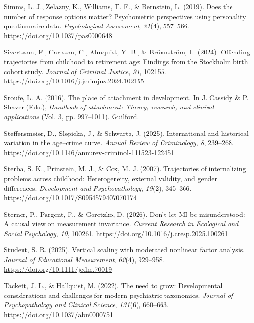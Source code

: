 \documentclass[
  american,
  letterpaper,
  12pt]{article}
\newlength{\cslhangindent}
\newenvironment{CSLReferences}[2] %
 {\begin{list}{}{%
  \setlength{\itemindent}{0pt}
  \setlength{\leftmargin}{0pt}
  \setlength{\parsep}{0pt}
  \ifodd #1
   \setlength{\leftmargin}{\cslhangindent}
   \setlength{\itemindent}{-1\cslhangindent}
  \fi
  \setlength{\itemsep}{#2\baselineskip}}}
 {\end{list}}
\begin{document}
\begin{CSLReferences}{1}{0}
Simms, L. J., Zelazny, K., Williams, T. F., \& Bernstein, L. (2019).
Does the number of response options matter? {Psychometric} perspectives
using personality questionnaire data. \emph{Psychological Assessment},
\emph{31}(4), 557--566. \url{https://doi.org/10.1037/pas0000648}

Sivertsson, F., Carlsson, C., Almquist, Y. B., \& Brännström, L. (2024).
Offending trajectories from childhood to retirement age: {Findings} from
the {Stockholm} birth cohort study. \emph{Journal of Criminal Justice},
\emph{91}, 102155. \url{https://doi.org/10.1016/j.jcrimjus.2024.102155}

Sroufe, L. A. (2016). The place of attachment in development. In J.
Cassidy \& P. Shaver (Eds.), \emph{Handbook of attachment: Theory,
research, and clinical applications} (Vol. 3, pp. 997--1011). Guilford.

Steffensmeier, D., Slepicka, J., \& Schwartz, J. (2025). International
and historical variation in the age--crime curve. \emph{Annual Review of
Criminology}, \emph{8}, 239--268.
\url{https://doi.org/10.1146/annurev-criminol-111523-122451}

Sterba, S. K., Prinstein, M. J., \& Cox, M. J. (2007). Trajectories of
internalizing problems across childhood: {Heterogeneity}, external
validity, and gender differences. \emph{Development and
Psychopathology}, \emph{19}(2), 345--366.
\url{https://doi.org/10.1017/S0954579407070174}

Sterner, P., Pargent, F., \& Goretzko, D. (2026). Don't let {MI} be
misunderstood: {A} causal view on measurement invariance. \emph{Current
Research in Ecological and Social Psychology}, \emph{10}, 100261.
\url{https://doi.org/10.1016/j.cresp.2025.100261}

Student, S. R. (2025). Vertical scaling with moderated nonlinear factor
analysis. \emph{Journal of Educational Measurement}, \emph{62}(4),
929--958. \url{https://doi.org/10.1111/jedm.70019}

Tackett, J. L., \& Hallquist, M. (2022). The need to grow:
{Developmental} considerations and challenges for modern psychiatric
taxonomies. \emph{Journal of Psychopathology and Clinical Science},
\emph{131}(6), 660--663. \url{https://doi.org/10.1037/abn0000751}


\end{CSLReferences}
\end{document}

